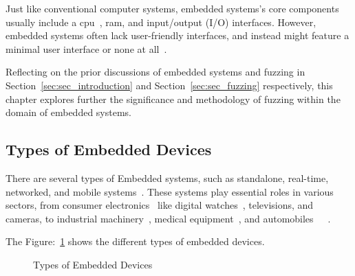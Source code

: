 Just like conventional computer systems, embedded systems's core components
usually include a \gls{cpu}~\cite{WhatisaC78:online},
\gls{ram}, and input/output (I/O) interfaces. However,
embedded systems often lack user-friendly interfaces, and instead might
feature a minimal user interface or none at all~\cite{MainType35:online}.

Reflecting on the prior discussions of embedded systems and fuzzing in
Section~\ref{sec:sec_introduction} and Section~\ref{sec:sec_fuzzing} respectively,
this chapter explores further the significance and methodology of fuzzing
within the domain of embedded systems.

\subsection{Types of Embedded Devices}
There are several types of Embedded systems, such as standalone,
real-time, networked, and mobile systems~\cite{Classifi68:online}. These systems
play essential roles in various sectors, from consumer
electronics~\cite{andrae2010life} like digital watches~\cite{Whatisas39:online},
televisions, and cameras, to industrial machinery~\cite{thramboulidis2007soa},
medical equipment~\cite{jafari2007medical},
and automobiles~\cite{Automoti68:online}~\cite{li2003real}~\cite{MainType35:online}.

The Figure:~\ref{fig:types_of_embedded_devices} shows the different types of embedded devices.

\begin{figure}[h]
        \centering
        {}
        \caption{Types of Embedded Devices~\cite{yun2022fuzzing}~\cite{WhatAreE30:online}}
        \label{fig:types_of_embedded_devices}
\end{figure}

